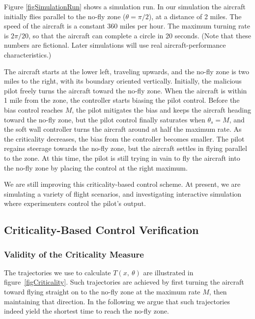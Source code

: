 \documentclass[11pt]{article}
\begin{document}
Figure \ref{figSimulationRun} shows a simulation run.  In our
simulation the aircraft initially flies parallel to the no-fly zone
($\theta = \pi / 2$), at a distance of 2 miles. The speed of the
aircraft is a constant 360 miles per hour. The maximum turning rate is
$2\pi/20$, so that the aircraft can complete a circle in 20
seconds. (Note that these numbers are fictional. Later simulations
will use real aircraft-performance characteristics.)

The aircraft starts at the lower left, traveling upwards, and the
no-fly zone is two miles to the right, with its boundary oriented
vertically.  Initially, the malicious pilot freely turns the aircraft
toward the no-fly zone. When the aircraft is within 1 mile from the
zone, the controller starts biasing the pilot control. Before the bias
control reaches $M$, the pilot mitigates the bias and keeps the
aircraft heading toward the no-fly zone, but the pilot control finally
saturates when $\theta_{s} = M$, and the soft wall controller turns
the aircraft around at half the maximum rate. As the criticality
decreases, the bias from the controller becomes smaller. The pilot
regains steerage towards the no-fly zone, but the aircraft settles in
flying parallel to the zone. At this time, the pilot is still trying
in vain to fly the aircraft into the no-fly zone by placing the
control at the right maximum.

We are still improving this criticality-based control scheme. At
present, we are simulating a variety of flight scenarios, and
investigating interactive simulation where experimenters control the
pilot's output.


\subsection{Criticality-Based Control Verification}

\subsubsection{Validity of the Criticality Measure}

The trajectories we use to calculate $T(x,\ \theta)$ are illustrated in
figure~\ref{figCriticality}. Such trajectories are achieved by first turning
the aircraft toward flying straight on to the no-fly zone at the maximum
rate $M$, then maintaining that direction. In the following we argue that
such trajectories indeed yield the shortest time to reach the no-fly zone.
\end{document}
